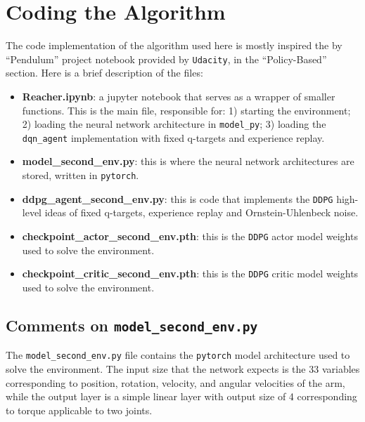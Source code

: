 \documentclass[
]{article}
\begin{document}
\hypertarget{coding-the-algorithm}{%
\section{Coding the Algorithm}\label{coding-the-algorithm}}

The code implementation of the algorithm used here is mostly inspired
the by ``Pendulum'' project notebook provided by \texttt{Udacity}, in
the ``Policy-Based'' section. Here is a brief description of the files:

\begin{itemize}
\item
  \textbf{Reacher.ipynb}: a jupyter notebook that serves as a wrapper of
  smaller functions. This is the main file, responsible for: 1) starting
  the environment; 2) loading the neural network architecture in
  \texttt{model\_py}; 3) loading the \texttt{dqn\_agent} implementation
  with fixed q-targets and experience replay.
\item
  \textbf{model\_second\_env.py}: this is where the neural network
  architectures are stored, written in \texttt{pytorch}.
\item
  \textbf{ddpg\_agent\_second\_env.py}: this is code that implements the
  \texttt{DDPG} high-level ideas of fixed q-targets, experience replay
  and Ornstein-Uhlenbeck noise.
\item
  \textbf{checkpoint\_actor\_second\_env.pth}: this is the \texttt{DDPG}
  actor model weights used to solve the environment.
\item
  \textbf{checkpoint\_critic\_second\_env.pth}: this is the
  \texttt{DDPG} critic model weights used to solve the environment.
\end{itemize}

\hypertarget{comments-on-model_second_env.py}{%
\subsection{\texorpdfstring{Comments on
\texttt{model\_second\_env.py}}{Comments on model\_second\_env.py}}\label{comments-on-model_second_env.py}}

The \texttt{model\_second\_env.py} file contains the \texttt{pytorch}
model architecture used to solve the environment. The input size that
the network expects is the 33 variables corresponding to position,
rotation, velocity, and angular velocities of the arm, while the output
layer is a simple linear layer with output size of 4 corresponding to
torque applicable to two joints.
\end{document}
